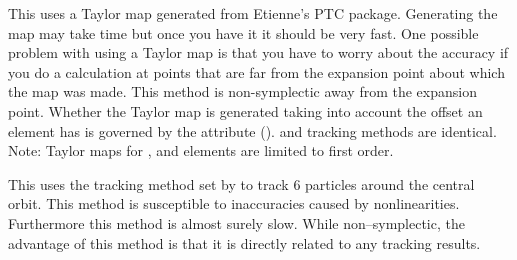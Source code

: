 \begin{description}
\item[\vn{Taylor}]
This uses a Taylor map generated from Etienne's PTC
package. Generating the map may take time but once you have it it
should be very fast. One possible problem with using a Taylor map is
that you have to worry about the accuracy if you do a calculation at
points that are far from the expansion point about which the map was
made. This method is non-symplectic away from the expansion
point. Whether the Taylor map is generated taking into account the
offset an element has is governed by the 
attribute ().  and 
tracking methods are identical. Note: Taylor maps for , and
 elements are limited to first order.

\item[\vn{Tracking}]
This uses the tracking method set by  to track 6
particles around the central orbit. This method is susceptible to inaccuracies
caused by nonlinearities. Furthermore this method
is almost surely slow. While non--symplectic, the advantage of this method
is that it is directly related to any tracking results.

\end{description}

